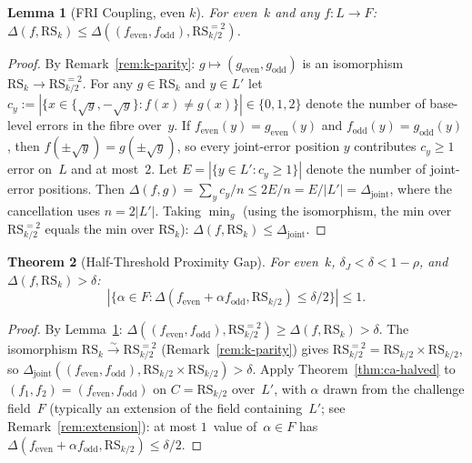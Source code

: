 \documentclass[11pt]{article}
\newtheorem{theorem}{Theorem}
\newtheorem{lemma}[theorem]{Lemma}
\newcommand{\RS}{\mathrm{RS}}
\begin{document}
\begin{lemma}[FRI Coupling, even $k$]
\label{lem:fri-coupling}
For even~$k$ and any $f: L \to F$:
$\Delta(f, \RS_k) \leq \Delta((f_{\mathrm{even}}, f_{\mathrm{odd}}), \RS_{k/2}^{=2})$.
\end{lemma}

\begin{proof}
By Remark~\ref{rem:k-parity}: $g \mapsto (g_{\mathrm{even}}, g_{\mathrm{odd}})$ is an isomorphism $\RS_k \to \RS_{k/2}^{=2}$. For any $g \in \RS_k$ and $y \in L'$ let $c_y := |\{x \in \{\sqrt{y}, -\sqrt{y}\} : f(x) \neq g(x)\}| \in \{0, 1, 2\}$ denote the number of base-level errors in the fibre over~$y$. If $f_{\mathrm{even}}(y) = g_{\mathrm{even}}(y)$ and $f_{\mathrm{odd}}(y) = g_{\mathrm{odd}}(y)$, then $f(\pm\sqrt{y}) = g(\pm\sqrt{y})$, so every joint-error position $y$ contributes $c_y \geq 1$ error on~$L$ and at most~$2$. Let $E = |\{y \in L' : c_y \geq 1\}|$ denote the number of joint-error positions. Then $\Delta(f,g) = \sum_y c_y / n \leq 2E / n = E / |L'| = \Delta_{\mathrm{joint}}$, where the cancellation uses $n = 2|L'|$. Taking $\min_g$ (using the isomorphism, the min over $\RS_{k/2}^{=2}$ equals the min over $\RS_k$):
$\Delta(f, \RS_k) \leq \Delta_{\mathrm{joint}}$.
\end{proof}

\begin{theorem}[Half-Threshold Proximity Gap]
\label{thm:proximity-gap}
For even~$k$, $\delta_J < \delta < 1{-}\rho$, and $\Delta(f, \RS_k) > \delta$:
$$|\{\alpha \in F : \Delta(f_{\mathrm{even}} + \alpha f_{\mathrm{odd}}, \RS_{k/2}) \leq \delta/2\}| \leq 1.$$
\end{theorem}

\begin{proof}
By Lemma~\ref{lem:fri-coupling}: $\Delta((f_{\mathrm{even}}, f_{\mathrm{odd}}), \RS_{k/2}^{=2}) \geq \Delta(f, \RS_k) > \delta$. The isomorphism $\RS_k \xrightarrow{\sim} \RS_{k/2}^{=2}$ (Remark~\ref{rem:k-parity}) gives $\RS_{k/2}^{=2} = \RS_{k/2} \times \RS_{k/2}$, so $\Delta_{\mathrm{joint}}((f_{\mathrm{even}}, f_{\mathrm{odd}}), \RS_{k/2} \times \RS_{k/2}) > \delta$. Apply Theorem~\ref{thm:ca-halved} to $(f_1, f_2) = (f_{\mathrm{even}}, f_{\mathrm{odd}})$ on $C = \RS_{k/2}$ over~$L'$, with $\alpha$ drawn from the challenge field~$F$ (typically an extension of the field containing~$L'$; see Remark~\ref{rem:extension}): at most $1$~value of~$\alpha \in F$ has $\Delta(f_{\mathrm{even}} + \alpha f_{\mathrm{odd}}, \RS_{k/2}) \leq \delta/2$.
\end{proof}
\end{document}
